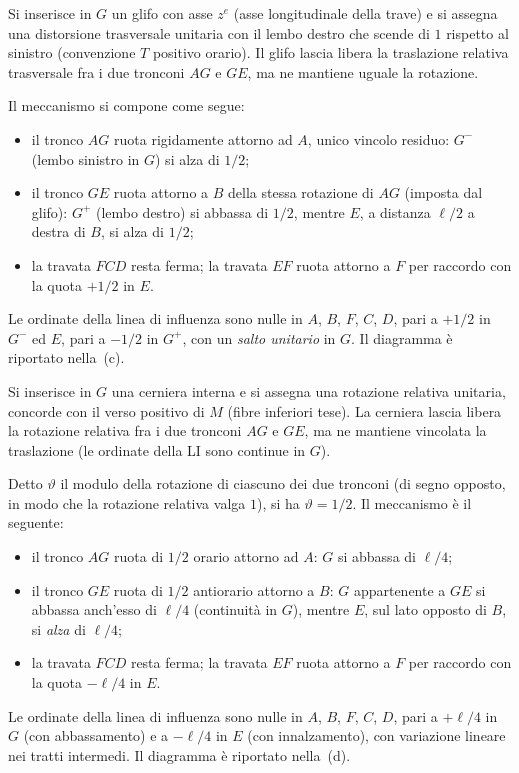 \begin{esempio}
\begin{svolgimento}
		Si inserisce in $G$ un glifo con asse $z^e$ (asse
		longitudinale della trave) e si assegna una
		distorsione trasversale unitaria con il lembo destro
		che scende di $1$ rispetto al sinistro (convenzione
		$T$ positivo orario). Il glifo lascia libera la
		traslazione relativa trasversale fra i due tronconi
		$AG$ e $GE$, ma ne mantiene uguale la rotazione.
		
		Il meccanismo si compone come segue:
		\begin{itemize}[noitemsep]
			\item il tronco $AG$ ruota rigidamente attorno ad
			$A$, unico vincolo residuo: $G^-$ (lembo sinistro
			in $G$) si alza di $1/2$;
			\item il tronco $GE$ ruota attorno a $B$ della
			stessa rotazione di $AG$ (imposta dal glifo): $G^+$
			(lembo destro) si abbassa di $1/2$, mentre $E$, a
			distanza $\ell/2$ a destra di $B$, si alza di $1/2$;
			\item la travata $FCD$ resta ferma; la travata $EF$
			ruota attorno a $F$ per raccordo con la quota
			$+1/2$ in $E$.
		\end{itemize}
		Le ordinate della linea di influenza sono nulle in
		$A$, $B$, $F$, $C$, $D$, pari a $+1/2$ in $G^-$ ed $E$,
		pari a $-1/2$ in $G^+$, con un \emph{salto unitario}
		in $G$. Il diagramma è riportato nella
		\,(c).
		
		
		Si inserisce in $G$ una cerniera interna e si assegna
		una rotazione relativa unitaria, concorde con il verso
		positivo di $M$ (fibre inferiori tese). La cerniera
		lascia libera la rotazione relativa fra i due tronconi
		$AG$ e $GE$, ma ne mantiene vincolata la traslazione
		(le ordinate della LI sono continue in $G$).
		
		Detto $\vartheta$ il modulo della rotazione di
		ciascuno dei due tronconi (di segno opposto, in modo
		che la rotazione relativa valga $1$), si ha
		$\vartheta = 1/2$. Il meccanismo è il seguente:
		\begin{itemize}[noitemsep]
			\item il tronco $AG$ ruota di $1/2$ orario attorno
			ad $A$: $G$ si abbassa di $\ell/4$;
			\item il tronco $GE$ ruota di $1/2$ antiorario
			attorno a $B$: $G$ appartenente a $GE$ si abbassa
			anch'esso di $\ell/4$ (continuità in $G$),
			mentre $E$, sul lato opposto di $B$, si \emph{alza}
			di $\ell/4$;
			\item la travata $FCD$ resta ferma; la travata $EF$
			ruota attorno a $F$ per raccordo con la quota
			$-\ell/4$ in $E$.
		\end{itemize}
		Le ordinate della linea di influenza sono nulle in
		$A$, $B$, $F$, $C$, $D$, pari a $+\ell/4$ in $G$ (con
		abbassamento) e a $-\ell/4$ in $E$ (con
		innalzamento), con variazione lineare nei tratti
		intermedi. Il diagramma è riportato nella
		\,(d).
		

\end{svolgimento}
\end{esempio}
